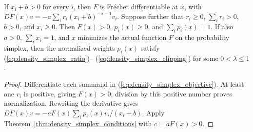 \begin{theorem}
\label{thm:density_simplex_last_filter}
\leanok
{}
If $x_i+b>0$ for every $i$, then $F$ is Fr\'echet differentiable at
$x$, with $DF(x)v=-a\sum_i r_i(x_i+b)^{-a-1}v_i$.
Suppose further that $r_i\ge0$, $\sum_i r_i>0$, $b>0$, and
$x_i\ge0$. Then $F(x)>0$, $p_i(x)\ge0$, and $\sum_i p_i(x)=1$.
If also $a>0$, $\sum_i x_i=1$, and $x$ minimizes the actual
function $F$ on the probability simplex, then the normalized
weights $p_i(x)$ satisfy (\ref{eq:density_simplex_ratio})--
(\ref{eq:density_simplex_clipping}) for some $0<\lambda\le1$.
\end{theorem}
\begin{proof}
\leanok
{}
Differentiate each summand in (\ref{eq:density_simplex_objective}).
At least one $r_i$ is positive, giving $F(x)>0$; division by this
positive number proves normalization. Rewriting the derivative gives
$DF(x)v=-aF(x)\sum_i p_i(x)v_i/(x_i+b)$. Apply
Theorem~\ref{thm:density_simplex_conditions} with $c=aF(x)>0$.
\end{proof}
